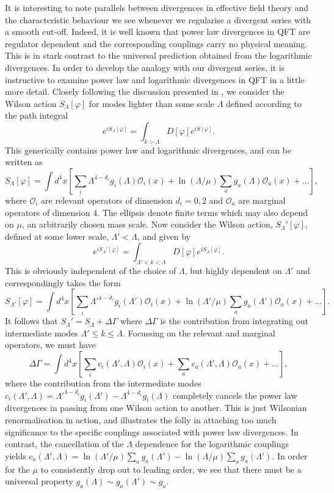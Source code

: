 \documentclass[11pt, letter]{article}
\def\be{\begin{equation}}
\def\ee{\end{equation}}
\newcommand{\Ocal}{\mathcal{O}}
\begin{document}
It is interesting to note parallels between divergences in effective field theory and the characteristic behaviour we see whenever we regularise a divergent series with a smooth cut-off.  Indeed, it is well known that power law divergences in QFT are regulator dependent and the corresponding couplings carry no physical meaning. This is in stark contrast to the universal prediction obtained from the logarithmic divergences. In order to develop the analogy with our divergent series, it is instructive to examine  power law and logarithmic divergences in QFT in a little more detail. Closely following the discussion presented in \cite{deRham:2014wfa}, we consider the Wilson action $S_\Lambda[\varphi]$ for modes lighter than some scale $\Lambda$ defined according to the path integral \cite{Burgess:2020tbq}
\be
e^{iS_\Lambda[\varphi]}=\int_{k>\Lambda} D [\varphi]e^{iS[\varphi]}.
\ee
This  generically contains power law and logarithmic divergences, and can be written as
\be
S_\Lambda[\varphi]=\int d^4 x \left[ \sum_i \Lambda^{4-d_i} g_i (\Lambda) \Ocal_i(x)+\ln(\Lambda/\mu)\sum_a g_a (\Lambda) \Ocal_a(x)+\ldots \right],
\ee
where $\Ocal_{i}$ are relevant operators of dimension  $d_i=0, 2$ and $\Ocal_{a}$ are marginal operators of dimension $4$.  The ellipsis denote finite terms which may also depend on $\mu$, an arbitrarily chosen  mass scale. Now consider the Wilson action, $S_\Lambda'[\varphi]$, defined at some lower scale, $\Lambda'<\Lambda$, and given by
\be
e^{iS_\Lambda'[\varphi]}=\int_{\Lambda'<k<\Lambda} D [\varphi]e^{iS_\Lambda[\varphi]}.
\ee
This is obviously independent of the choice of $\Lambda$, but highly dependent on $\Lambda'$ and correspondingly takes the form
\be
S_{\Lambda'}[\varphi]=\int d^4 x \left[ \sum_i \Lambda'^{4-d_i} g_i (\Lambda') \Ocal_i(x)+\ln(\Lambda'/\mu)\sum_a g_a (\Lambda') \Ocal_a(x)+\ldots \right].
\ee
It follows that $S_\Lambda'=S_\Lambda+\Delta \Gamma$ where $\Delta \Gamma$ is the contribution from integrating out intermediate modes $\Lambda' \leq k \leq \Lambda$. Focussing on the relevant and marginal operators, we must have
\be
\Delta \Gamma = \int d^4 x \left[ \sum_i c_i(\Lambda', \Lambda) \Ocal_i(x)+\sum_a c_a(\Lambda', \Lambda) \Ocal_a(x)+\ldots \right],
\ee
where the contribution from the intermediate modes $c_i(\Lambda', \Lambda)=\Lambda'^{4-d_i} g_i (\Lambda') -\Lambda^{4-d_i} g_i (\Lambda)$ completely cancels the power law divergences in passing from one Wilson action to another.  This is just Wilsonian renormalisation in action, and illustrates the folly in attaching too much  significance to the specific couplings associated with power law divergences. In contrast, the cancellation of the $\Lambda$ dependence for the  logarithmic couplings yields $c_a (\Lambda', \Lambda)= \ln(\Lambda'/\mu)\sum_a g_a (\Lambda')-\ln(\Lambda/\mu)\sum_a g_a (\Lambda')$. In order for the $\mu$ to consistently drop out to leading order, we see that there must be a universal property   $g_a(\Lambda) \sim g_a(\Lambda') \sim g_a$.
\end{document}

